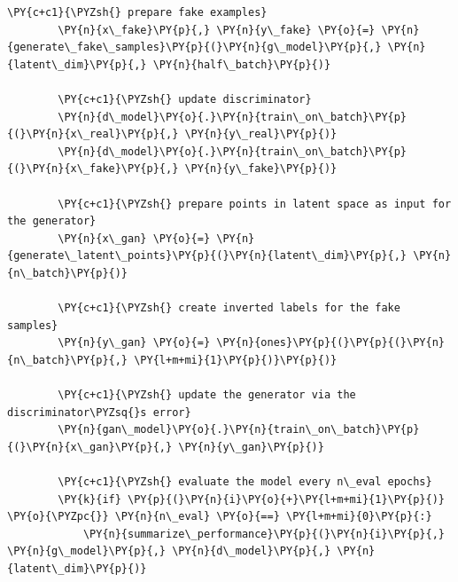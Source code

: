 \begin{Verbatim}[label=\makebox{\url{https://github.com/lucabaldini/cmepda/tree/master/slides/latex/snippets/gan_training.py}},commandchars=\\\{\}]
        \PY{c+c1}{\PYZsh{} prepare fake examples}
        \PY{n}{x\_fake}\PY{p}{,} \PY{n}{y\_fake} \PY{o}{=} \PY{n}{generate\_fake\_samples}\PY{p}{(}\PY{n}{g\_model}\PY{p}{,} \PY{n}{latent\_dim}\PY{p}{,} \PY{n}{half\_batch}\PY{p}{)}
        
        \PY{c+c1}{\PYZsh{} update discriminator}
        \PY{n}{d\_model}\PY{o}{.}\PY{n}{train\_on\_batch}\PY{p}{(}\PY{n}{x\_real}\PY{p}{,} \PY{n}{y\_real}\PY{p}{)}
        \PY{n}{d\_model}\PY{o}{.}\PY{n}{train\_on\_batch}\PY{p}{(}\PY{n}{x\_fake}\PY{p}{,} \PY{n}{y\_fake}\PY{p}{)}
        
        \PY{c+c1}{\PYZsh{} prepare points in latent space as input for the generator}
        \PY{n}{x\_gan} \PY{o}{=} \PY{n}{generate\_latent\_points}\PY{p}{(}\PY{n}{latent\_dim}\PY{p}{,} \PY{n}{n\_batch}\PY{p}{)}
        
        \PY{c+c1}{\PYZsh{} create inverted labels for the fake samples}
        \PY{n}{y\_gan} \PY{o}{=} \PY{n}{ones}\PY{p}{(}\PY{p}{(}\PY{n}{n\_batch}\PY{p}{,} \PY{l+m+mi}{1}\PY{p}{)}\PY{p}{)}
        
        \PY{c+c1}{\PYZsh{} update the generator via the discriminator\PYZsq{}s error}
        \PY{n}{gan\_model}\PY{o}{.}\PY{n}{train\_on\_batch}\PY{p}{(}\PY{n}{x\_gan}\PY{p}{,} \PY{n}{y\_gan}\PY{p}{)}
        
        \PY{c+c1}{\PYZsh{} evaluate the model every n\_eval epochs}
        \PY{k}{if} \PY{p}{(}\PY{n}{i}\PY{o}{+}\PY{l+m+mi}{1}\PY{p}{)} \PY{o}{\PYZpc{}} \PY{n}{n\_eval} \PY{o}{==} \PY{l+m+mi}{0}\PY{p}{:}
            \PY{n}{summarize\_performance}\PY{p}{(}\PY{n}{i}\PY{p}{,} \PY{n}{g\_model}\PY{p}{,} \PY{n}{d\_model}\PY{p}{,} \PY{n}{latent\_dim}\PY{p}{)}
\end{Verbatim}